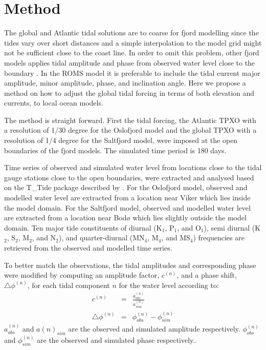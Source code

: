 \section{Method}

The global and Atlantic tidal solutions are to coarse for fjord modelling since the tides vary over short distances and a simple interpolation to the model grid might not be sufficient close to the coast line. In order to omit this problem, other fjord models applies tidal amplitude and phase from observed water level close to the boundary \cite[i.e.]{svendsen96,lynge13}. In the ROMS model it is preferable to include the tidal current major amplitude, minor amplitude, phase, and inclination angle. Here we propose a method on how to adjust the global tidal forcing in terms of both elevation and currents, to local ocean models. 

The method is straight forward. First the tidal forcing, the Atlantic TPXO with a resolution of 1/30 degree for the Oslofjord model and the global TPXO with a resolution of 1/4 degree for the Saltfjord model, were imposed at the open boundaries of the fjord models. The simulated time period is 180 days. 

Time series of observed and simulated water level from locations close to the tidal gauge stations close to the open boundaries, were extracted and analysed based on the T\_Tide package described by \cite{pawlowicz02}. For the Oslofjord model, observed and modelled water level are extracted from a location near Viker which lies inside the model domain. For the Saltfjord model, observed and modelled water level are extracted from a location near Bod{\o} which lies slightly outside the model domain. Ten major tide constituents of diurnal (K$_1$, P$_1$, and O$_1$), semi diurnal (K$_2$, S$_2$, M$_2$, and N$_2$), and quarter-diurnal (MN$_4$, M$_4$, and MS$_4$) frequencies are retrieved from the observed and modelled time series. 

To better match the observations, the tidal amplitudes and corresponding phase were modified by computing an amplitude factor, $c^{(n)}$, and a phase shift, $\triangle \phi^{(n)}$, for each tidal component $n$ for the water level according to:
\begin{eqnarray}
c^{(n)} &=& \frac{a^{(n)}_{obs}}{a^{(n)}_{sim}} \\
\triangle \phi^{(n)} &=& \phi^{(n)}_{obs} - \phi^{(n)}_{sim}
\end{eqnarray}
$a^{(n)}_{obs}$ and $a{(n)}_{sim}$ are the observed and simulated amplitude respectively. $\phi^{(n)}_{obs}$ and $\phi^{(n)}_{sim}$ are the observed and simulated phase respectively.. 

